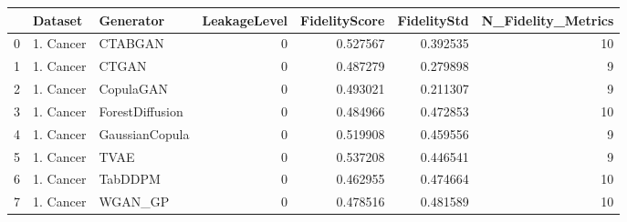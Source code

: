 \begin{tabular}{lllrrrr}
\toprule
 & Dataset & Generator & LeakageLevel & FidelityScore & FidelityStd & N_Fidelity_Metrics \\
\midrule
0 & 1. Cancer & CTABGAN & 0 & 0.527567 & 0.392535 & 10 \\
1 & 1. Cancer & CTGAN & 0 & 0.487279 & 0.279898 & 9 \\
2 & 1. Cancer & CopulaGAN & 0 & 0.493021 & 0.211307 & 9 \\
3 & 1. Cancer & ForestDiffusion & 0 & 0.484966 & 0.472853 & 10 \\
4 & 1. Cancer & GaussianCopula & 0 & 0.519908 & 0.459556 & 9 \\
5 & 1. Cancer & TVAE & 0 & 0.537208 & 0.446541 & 9 \\
6 & 1. Cancer & TabDDPM & 0 & 0.462955 & 0.474664 & 10 \\
7 & 1. Cancer & WGAN_GP & 0 & 0.478516 & 0.481589 & 10 \\
\bottomrule
\end{tabular}
